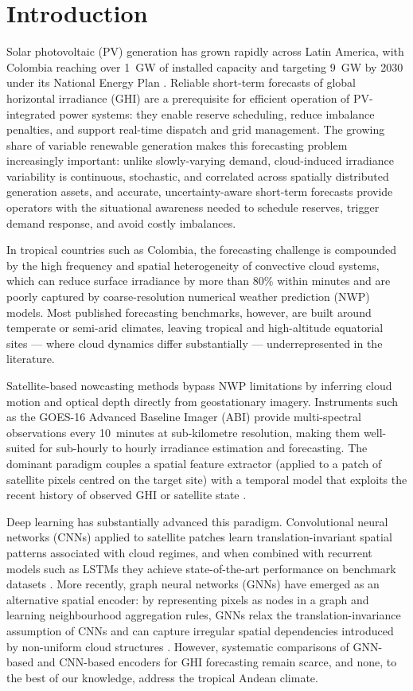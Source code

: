 \section{Introduction}
\label{sec:intro}

Solar photovoltaic (PV) generation has grown rapidly across
Latin America, with Colombia reaching over 1~GW of installed capacity and
targeting 9~GW by 2030 under its National Energy Plan \cite{upme2023}.
Reliable short-term forecasts of global horizontal irradiance (GHI) are a
prerequisite for efficient operation of PV-integrated power systems: they
enable reserve scheduling, reduce imbalance penalties, and support real-time
dispatch and grid management. The growing share of variable renewable
generation makes this forecasting problem increasingly important: unlike
slowly-varying demand, cloud-induced irradiance variability is continuous,
stochastic, and correlated across spatially distributed generation assets,
and accurate, uncertainty-aware short-term forecasts provide operators with
the situational awareness needed to schedule reserves, trigger demand
response, and avoid costly imbalances.

In tropical countries such as Colombia, the forecasting challenge is compounded
by the high frequency and spatial heterogeneity of convective cloud systems,
which can reduce surface irradiance by more than 80\% within minutes and are
poorly captured by coarse-resolution numerical weather prediction (NWP) models.
Most published forecasting benchmarks, however, are built around temperate or
semi-arid climates, leaving tropical and high-altitude equatorial sites ---
where cloud dynamics differ substantially --- underrepresented in the
literature.

Satellite-based nowcasting methods bypass NWP limitations by inferring cloud
motion and optical depth directly from geostationary imagery. Instruments such as
the GOES-16 Advanced Baseline Imager (ABI) provide multi-spectral observations
every 10~minutes at sub-kilometre resolution, making them well-suited for
sub-hourly to hourly irradiance estimation and forecasting. The dominant paradigm
couples a spatial feature extractor (applied to a patch of satellite pixels
centred on the target site) with a temporal model that exploits the recent
history of observed GHI or satellite state \cite{zhang2015,reno2016}.

Deep learning has substantially advanced this paradigm. Convolutional neural
networks (CNNs) applied to satellite patches learn translation-invariant spatial
patterns associated with cloud regimes, and when combined with recurrent models
such as LSTMs they achieve state-of-the-art performance on benchmark datasets
\cite{alessandrini2015,huertas2018,paletta2021}. More recently, graph neural networks
(GNNs) have emerged as an alternative spatial encoder: by representing pixels as
nodes in a graph and learning neighbourhood aggregation rules, GNNs relax the
translation-invariance assumption of CNNs and can capture irregular spatial
dependencies introduced by non-uniform cloud structures \cite{hamilton2017,ji2022}.
However, systematic comparisons of GNN-based and CNN-based encoders for GHI
forecasting remain scarce, and none, to the best of our knowledge, address the
tropical Andean climate.

